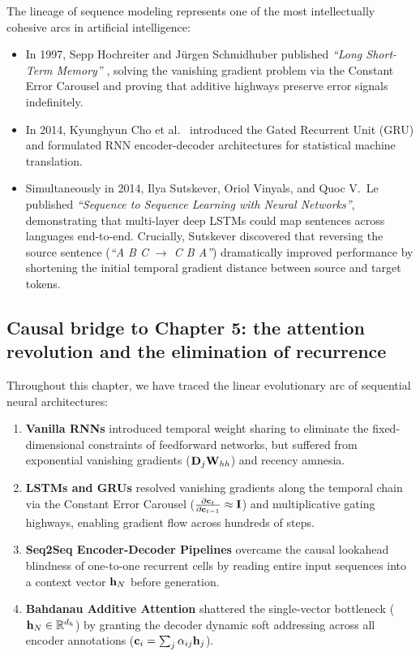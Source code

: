 \documentclass[../../main.tex]{subfiles}
\begin{document}
\begin{deepdive}
The lineage of sequence modeling represents one of the most intellectually cohesive arcs in artificial intelligence:
\begin{itemize}
    \item In 1997, Sepp Hochreiter and J{\"u}rgen Schmidhuber published \textit{``Long Short-Term Memory''} \cite{hochreiter1997}, solving the vanishing gradient problem via the Constant Error Carousel and proving that additive highways preserve error signals indefinitely.
    \item In 2014, Kyunghyun Cho et al.~\cite{cho2014} introduced the Gated Recurrent Unit (GRU) and formulated RNN encoder-decoder architectures for statistical machine translation.
    \item Simultaneously in 2014, Ilya Sutskever, Oriol Vinyals, and Quoc V.~Le \cite{sutskever2014} published \textit{``Sequence to Sequence Learning with Neural Networks''}, demonstrating that multi-layer deep LSTMs could map sentences across languages end-to-end. Crucially, Sutskever discovered that reversing the source sentence (\textit{``A B C $\to$ C B A''}) dramatically improved performance by shortening the initial temporal gradient distance between source and target tokens.
\end{itemize}
\end{deepdive}

\subsection{Causal bridge to Chapter 5: the attention revolution and the elimination of recurrence}
\label{subsec:bridge_to_chapter_5}

Throughout this chapter, we have traced the linear evolutionary arc of sequential neural architectures:
\begin{enumerate}
    \item \textbf{Vanilla RNNs} introduced temporal weight sharing to eliminate the fixed-dimensional constraints of feedforward networks, but suffered from exponential vanishing gradients ($\mathbf{D}_j \mathbf{W}_{hh}$) and recency amnesia.
    \item \textbf{LSTMs and GRUs} resolved vanishing gradients along the temporal chain via the Constant Error Carousel ($\frac{\partial \mathbf{c}_t}{\partial \mathbf{c}_{t-1}} \approx \mathbf{I}$) and multiplicative gating highways, enabling gradient flow across hundreds of steps.
    \item \textbf{Seq2Seq Encoder-Decoder Pipelines} overcame the causal lookahead blindness of one-to-one recurrent cells by reading entire input sequences into a context vector $\mathbf{h}_N$ before generation.
    \item \textbf{Bahdanau Additive Attention} shattered the single-vector bottleneck ($\mathbf{h}_N \in \mathbb{R}^{d_h}$) by granting the decoder dynamic soft addressing across all encoder annotations ($\mathbf{c}_i = \sum_j \alpha_{ij} \mathbf{h}_j$).
\end{enumerate}
\end{document}

